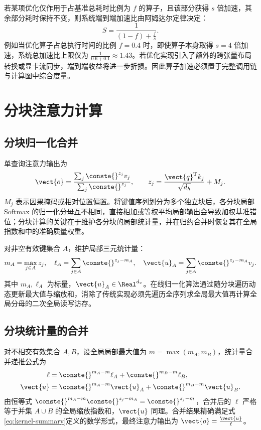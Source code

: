 \documentclass[../textbook.tex]{subfiles}
\begin{document}
若某项优化仅作用于占基准总耗时比例为 $f$ 的算子，且该部分获得 $s$ 倍加速，其余部分耗时保持不变，则系统端到端加速比由阿姆达尔定律决定：
\begin{equation}
 S=\frac{1}{(1-f)+\frac{f}{s}}.
 \label{eq:kernel-amdahl}
\end{equation}
例如当优化算子占总执行时间的比例 $f=0.4$ 时，即使算子本身取得 $s=4$ 倍加速，系统总加速比上限仅为 $\frac{1}{0.6+0.1}\approx 1.43$。若优化实现引入了额外的跨张量布局转换或显卡流同步，端到端收益将进一步折损。因此算子加速必须置于完整调用链与计算图中综合度量。

\section{分块注意力计算}

\subsection{分块归一化合并}
单查询注意力输出为
\begin{equation}
 \vect{o}=\frac{\sum_j \conste{}^{z_j}v_j}{\sum_j \conste{}^{z_j}},\qquad
 z_j=\frac{\vect{q}^{\mathrm{T}}k_j}{\sqrt{d_h}}+M_j.
 \label{eq:kernel-attention}
\end{equation}
$M_j$ 表示因果掩码或相对位置偏置。将键值序列划分为多个独立块后，各分块局部 Softmax 的归一化分母互不相同，直接相加或等权平均局部输出会导致加权基准错位；分块计算的关键在于维护各分块的局部统计量，并在归约合并时恢复其在全局指数和中的准确质量权重。

对非空有效键集合 $A$，维护局部三元统计量：
\begin{equation}
 m_A=\max_{j\in A}z_j,\quad
 \ell_A=\sum_{j\in A}\conste{}^{z_j-m_A},\quad
 \vect{u}_A=\sum_{j\in A}\conste{}^{z_j-m_A}v_j.
 \label{eq:kernel-summary}
\end{equation}
其中 $m_A,\ell_A$ 为标量，$\vect{u}_A\in\Real^{d_v}$。在线归一化算法通过随分块遍历动态更新最大值与缩放和，消除了传统实现必须先遍历全序列求全局最大值再计算全局分母的二次全局读写访存\autocite{milakov2018online}。

\subsection{分块统计量的合并}
对不相交有效集合 $A,B$，设全局局部最大值为 $m=\max(m_A,m_B)$，统计量合并递推公式为
\begin{align}
 \ell&=\conste{}^{m_A-m}\ell_A+\conste{}^{m_B-m}\ell_B,\\
 \vect{u}&=\conste{}^{m_A-m}\vect{u}_A+\conste{}^{m_B-m}\vect{u}_B.
 \label{eq:kernel-merge}
\end{align}
由恒等式 $\conste{}^{m_A-m}\conste{}^{z_j-m_A}=\conste{}^{z_j-m}$，合并后的 $\ell$ 严格等于并集 $A\cup B$ 的全局缩放指数和，$\vect{u}$ 同理。合并结果精确满足式\eqref{eq:kernel-summary}定义的数学形式，最终注意力输出为 $\vect{o}=\frac{\vect{u}}{\ell}$。
\end{document}

